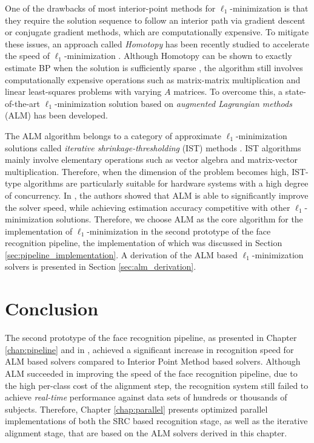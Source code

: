 One of the drawbacks of most interior-point methods for $\ell_1$-minimization
is that they require the solution sequence to follow an interior path via
gradient descent or conjugate gradient methods, which are computationally
expensive.  To mitigate these issues, an approach called \emph{Homotopy} has
been recently studied to accelerate the speed of $\ell_1$-minimization
\cite{OsborneM2000,EfronB2004,MalioutovD2005,DonohoD2006}.  Although Homotopy
can be shown to exactly estimate BP when the solution is sufficiently sparse
\cite{DonohoD2006}, the algorithm still involves computationally expensive
operations such as matrix-matrix multiplication and linear least-squares
problems with varying $A$ matrices.  To overcome this, a state-of-the-art
$\ell_1$-minimization solution based on \emph{augmented Lagrangian methods}
(ALM) \cite{BertsekasD2003,YangA2010-ICIP} has been developed.

The ALM algorithm belongs to a category of approximate $\ell_1$-minimization
solutions called \emph{iterative shrinkage-thresholding} (IST) methods
\cite{WrightS2008,BeckA2009}.  IST algorithms mainly involve elementary
operations such as vector algebra and matrix-vector multiplication. Therefore,
when the dimension of the problem becomes high, IST-type algorithms are
particularly suitable for hardware systems with a high degree of concurrency.
In \cite{YangA2010-ICIP}, the authors showed that ALM is able to significantly
improve the solver speed, while achieving estimation accuracy competitive with
other $\ell_1$-minimization solutions. Therefore, we choose ALM as the core
algorithm for the implementation of $\ell_1$-minimization in the second
prototype of the face recognition pipeline, the implementation of which was
discussed in Section \ref{sec:pipeline_implementation}.  A derivation of the
ALM based $\ell_1$-minimization solvers is presented in Section
\ref{sec:alm_derivation}.



%
%
%

\section{Conclusion}
The second prototype of the face recognition pipeline, as presented in Chapter
\ref{chap:pipeline} and in \cite{WagnerA2011-PAMI}, achieved a significant
increase in recognition speed for ALM based solvers compared to Interior Point
Method based solvers.  Although ALM succeeded in improving the speed of the
face recognition pipeline, due to the high per-class cost of the alignment
step, the recognition system still failed to achieve \emph{real-time}
performance against data sets of hundreds or thousands of subjects.  Therefore,
Chapter \ref{chap:parallel} presents optimized parallel implementations of both
the SRC based recognition stage, as well as the iterative alignment stage, that
are based on the ALM solvers derived in this chapter.


